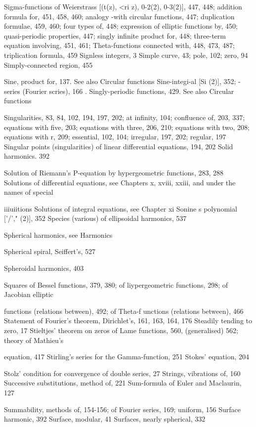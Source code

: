 Sigma-functions of Weierstrass [(t(z), <ri z), 0-2(2), 0-3(2)], 447, 448; addition formula for, 451,
458, 460; analogy -with circular functions, 447; duplication formulae, 459, 460; four
types of, 448; expression of elliptic functions by, 450; quasi-periodic properties, 447;
singly infinite product for, 448; three-term equation involving, 451, 461; Theta-functions
connected with, 448, 473, 487; triplication formula, 459
Signless integers, 3
Simple curve, 43; pole, 102; zero, 94
Simply-connected region, 455

Sine, product for, 137. See also Circular functions
Sine-integi-al [Si (2)], 352; -series (Fourier scries), 166 .
Singly-periodic functions, 429. See also Circular functions

Singularities, 83, 84, 102, 194, 197, 202; at infinity, 104; confluence of, 203, 337; equations
with five, 203; equations with three, 206, 210; equations with two, 208; equations with r,
209; essential, 102, 104; irregular, 197, 202; regular, 197
Singular points (singularities) of linear differential equations, 194, 202
Solid harmonics. 392

Solution of Riemann's P-equation by hypergeometric functions, 283, 288
Solutions of differential equations, see Chapters x, xviii, xxiii, and under the names of special

iiiuiitions
Solutions of integral equations, see Chapter xi
Sonine s polynomial ['/'," (2)], 352
Species (various) of ellipsoidal harmonics, 537

%
%

Spherical harmonics, see Harmonics

Spherical spiral, Seiffert's, 527

Spheroidal harmonics, 403

Squares of Bessel functions, 379, 380; of liypergeometric functions, 298; of Jacobian elliptic

functions (relations between), 492; of Theta-f unctions (relations between), 466
Statement of Fourier's theorem, Dirichlet's, 161, 163, 164, 176
Steadily tending to zero, 17
Stieltjes' theorem on zeros of Lame functions, 560, (generalised) 562; theory of Mathieu's

equation, 417
Stirling's series for the Gamma-function, 251
Stokes' equation, 204

Stolz' condition for convergence of double series, 27
Strings, vibrations of, 160
Successive substitutions, method of, 221
Sum-formula of Euler and Maclaurin, 127

Summability, methods of, 154-156; of Fourier series, 169; uniform, 156
Surface harmonic, 392
Surface, modular, 41
Surfaces, nearly spherical, 332

